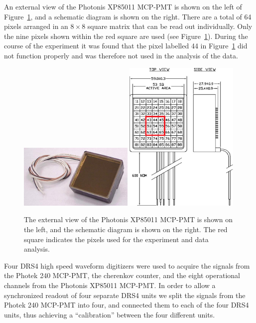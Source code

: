 An external view
of the Photonis XP85011 MCP-PMT is shown on the left of Figure~\ref{fig:photonis},
and a schematic diagram is shown on the right. There are a total of 64 pixels
arranged in an $8\times8$ square matrix that can be read out
individually. Only the nine pixels shown within the red square are
used (see Figure~\ref{fig:photonis}). During the
course of the experiment it was found that the pixel labelled 44 in
Figure~\ref{fig:photonis} did not function properly and was therefore not used
in the analysis of the data. 
\begin{figure}[h] 
\centering
\includegraphics[width=0.49\textwidth]{Images/photonis/photonis.jpg}
\includegraphics[width=0.49\textwidth]{Images/photonis/photonis2.png}
\caption{The external view of the Photonis XP85011 MCP-PMT is shown on the left, and
the schematic diagram is shown on the right. The red square indicates the pixels
used for the experiment and data analysis.} 
\label{fig:photonis} 
\end{figure}
Four DRS4 high speed waveform digitizers were used to acquire the signals from
the Photek 240 MCP-PMT, the cherenkov counter, and the eight operational
channels from the Photonis XP85011 MCP-PMT. In order to allow a synchronized
readout of four separate DRS4 units we split the signals from the Photek 240
MCP-PMT into four, and connected them to each of the four DRS4 units, thus achieving
a ``calibration'' between the four different units.  

